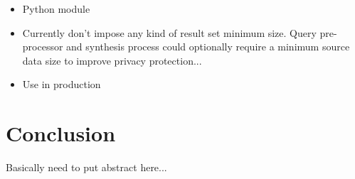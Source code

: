 \documentclass{article}
\begin{document}
\begin{itemize}
    \item Python module
    \item Currently don't impose any kind of result set minimum size. Query pre-processor and synthesis process could optionally require a minimum source data size to improve privacy protection...
    \item Use in production
\end{itemize}


\section{Conclusion}

Basically need to put abstract here...





\end{document}
